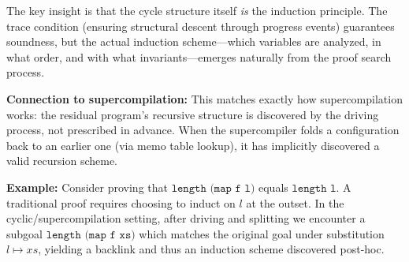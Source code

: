 The key insight is that the cycle structure itself \emph{is} the induction principle. The trace condition (ensuring structural descent through progress events) guarantees soundness, but the actual induction scheme---which variables are analyzed, in what order, and with what invariants---emerges naturally from the proof search process.

\textbf{Connection to supercompilation:} This matches exactly how supercompilation works: the residual program's recursive structure is discovered by the driving process, not prescribed in advance. When the supercompiler folds a configuration back to an earlier one (via memo table lookup), it has implicitly discovered a valid recursion scheme.

\textbf{Example:} Consider proving that $\texttt{length (map f l)}$ equals $\texttt{length l}$. A traditional proof requires choosing to induct on $l$ at the outset. In the cyclic/supercompilation setting, after driving and splitting we encounter a subgoal $\texttt{length (map f xs)}$ which matches the original goal under substitution $l \mapsto xs$, yielding a backlink and thus an induction scheme discovered post-hoc.
